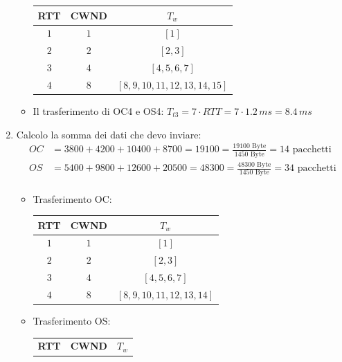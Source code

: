 \documentclass[10pt]{article}
\newcommand{\lightrule}{%
	\arrayrulecolor{black!30}%
	\midrule[\lightrulewidth]%
	\arrayrulecolor{black}}
\begin{document}
\begin{enumerate}
\begin{itemize}
\begin{center}
\begin{tabular}{@{} *{3}{c} @{}}
 				\toprule
 					\textbf{RTT} & \textbf{CWND} & \textbf{$T_w$} \\
 				\midrule
 					$1$ & $1$ & $[1]$ \\ 
				\lightrule
 					$2$ & $2$ & $[2,3]$ \\
				\lightrule
 					$3$ & $4$ & $[4,5,6,7]$ \\ 				
 				\lightrule
 					$4$ & $8$ & $[8,9,10,11,12,13,14,15]$ \\
				\bottomrule
				\end{tabular}
			\end{center}
			\item Il trasferimento di OC4 e OS4: $T_{t3} = 7 \cdot RTT = 7 \cdot 1.2 \,ms = 8.4 \,ms$
		\end{itemize}
		\item
		Calcolo la somma dei dati che devo inviare:
		\begin{equation*}
			\begin{split}
				OC & = 3800 + 4200 + 10400 + 8700 = 19100 = \frac{19100 \textrm{ Byte}}{1450 \textrm{ Byte}} = 14 \textrm{ pacchetti}\\  
				OS & = 5400 + 9800 + 12600 + 20500 = 48300 = \frac{48300 \textrm{ Byte}}{1450 \textrm{ Byte}} = 34 \textrm{ pacchetti}\\  
			\end{split}
			\end{equation*}
			\begin{itemize}
				\item Trasferimento OC:
				\begin{center}
					\centering
 					\begin{tabular}{@{} *{3}{c} @{}}
 					\toprule
 						\textbf{RTT} & \textbf{CWND} & \textbf{$T_w$} \\
 					\midrule
 						$1$ & $1$ & $[1]$ \\ 
					\lightrule
 						$2$ & $2$ & $[2,3]$ \\  
 					\lightrule
 						$3$ & $4$ & $[4,5,6,7]$ \\ 
 					\lightrule
 						$4$ & $8$ & $[8,9,10,11,12,13,14]$ \\
					\bottomrule
					\end{tabular}
				\end{center}
				\item Trasferimento OS:
				\begin{center}
					\centering
 					\begin{tabular}{@{} *{3}{c} @{}}
 					\toprule
 						\textbf{RTT} & \textbf{CWND} & \textbf{$T_w$} \\

\end{tabular}
\end{center}
\end{itemize}
\end{enumerate}
\end{document}
